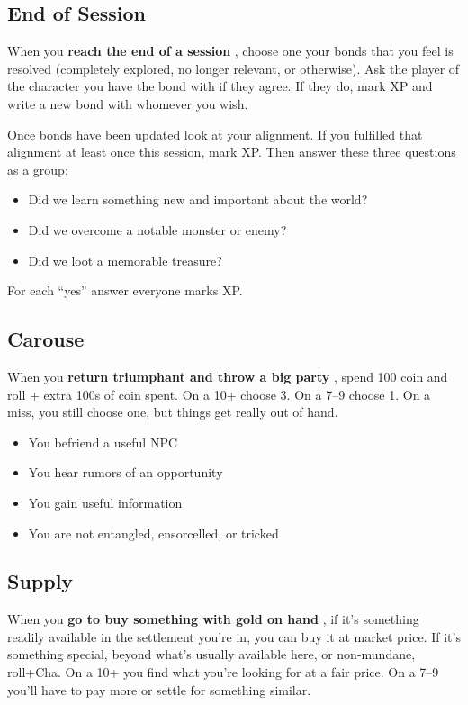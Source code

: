 \subsection{End of Session}


 When you \textbf{reach the end of a session}
, choose one your bonds that you feel is resolved (completely explored, no longer relevant, or otherwise). Ask the player of the character you have the bond with if they agree. If they do, mark XP and write a new bond with whomever you wish.


 Once bonds have been updated look at your alignment. If you fulfilled that alignment at least once this session, mark XP\@. Then answer these three questions as a group:
\begin{itemize}
\item Did we learn something new and important about the world?
\item Did we overcome a notable monster or enemy?
\item Did we loot a memorable treasure?

\end{itemize}


 For each ``yes'' answer everyone marks XP\@.
\subsection{Carouse}


 When you \textbf{return triumphant and throw a big party}
, spend 100 coin and roll + extra 100s of coin spent. On a 10+ choose 3. On a 7--9 choose 1. On a miss, you still choose one, but things get really out of hand.
\begin{itemize}
\item You befriend a useful NPC
\item You hear rumors of an opportunity
\item You gain useful information
\item You are not entangled, ensorcelled, or tricked

\end{itemize}
\subsection{Supply}


 When you \textbf{go to buy something with gold on hand}
, if it's something readily available in the settlement you're in, you can buy it at market price. If it's something special, beyond what's usually available here, or non-mundane, roll+Cha. On a 10+ you find what you're looking for at a fair price. On a 7--9 you'll have to pay more or settle for something similar.
